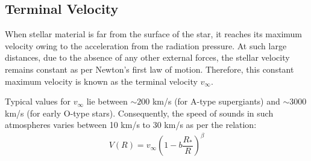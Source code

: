         \subsection{Terminal Velocity} \label{tool:stellar-winds:term-vel}
        	When stellar material is far from the surface of the star, it reaches its maximum velocity owing to the acceleration from the radiation pressure. At such large distances, due to the absence of any other external forces, the stellar velocity remains constant as per Newton's first law of motion. Therefore, this constant maximum velocity is known as the terminal velocity $v_\infty$.
        	
        	Typical values for $v_\infty$ lie between $\sim 200$ km/s (for A-type supergiants) and $\sim 3000$ km/s (for early O-type stars). Consequently, the speed of sounds in such atmospheres varies between 10 km/s to 30 km/s as per the relation:
        	\begin{align*}
        		V(R)=v_\infty\left(1-b\dfrac{R_*}{R}\right)^\beta
        	\end{align*}
	
